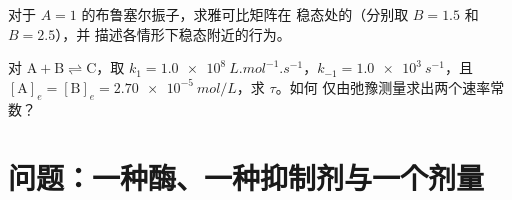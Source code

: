 \begin{exercise}[$\star\star\star$]\label{exo:b3:complex-kinetics:11}
对于 $A = 1$ 的布鲁塞尔振子，求雅可比矩阵在
稳态处的（分别取 $B = 1.5$ 和 $B = 2.5$），并
描述各情形下稳态附近的行为。
\end{exercise}

\begin{exercise}[$\star\star\star$]\label{exo:b3:complex-kinetics:12}
 对 $\mathrm{A + B \rightleftharpoons C}$，取 $k_1 = \qty{1.0e8}{L.mol^{-1}.s^{-1}}$，$k_{-1} = \qty{1.0e3}{s^{-1}}$，且
 $[\mathrm A]_e = [\mathrm B]_e = \qty{2.70e-5}{mol/L}$，求 $\tau$。如何
 仅由弛豫测量求出两个速率常数？
\end{exercise}

\section{问题：一种酶、一种抑制剂与一个剂量}

